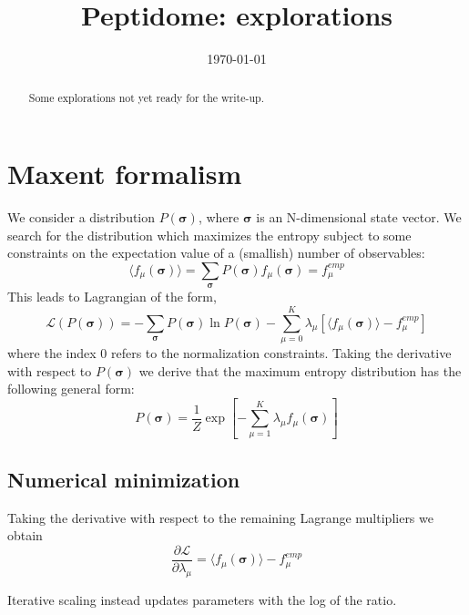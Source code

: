 \documentclass[superscriptaddress,onecolumn,pre]{revtex4}
\newcommand{\B}{\boldsymbol}
\newcommand{\<}{\langle}
\renewcommand{\>}{\rangle}
\def\[[{\left[}
\def\]]{\right]}
\begin{document}
\title{Peptidome: explorations}
\date{\today}

\begin{abstract}
    Some explorations not yet ready for the write-up.
\end{abstract}

\maketitle

\section{Maxent formalism}
We consider a distribution $P(\boldsymbol \sigma)$, where $\boldsymbol \sigma$ is an N-dimensional state vector. We search for the distribution which maximizes the entropy subject to some constraints on the expectation value of a (smallish) number of observables:
\begin{equation}
\langle f_\mu(\boldsymbol \sigma)\rangle = \sum_{\boldsymbol \sigma} P(\boldsymbol \sigma) f_\mu(\boldsymbol \sigma) = f_\mu^{emp}
\end{equation}
This leads to Lagrangian of the form,
\begin{equation}
    \mathcal{L}(P(\B \sigma)) = - \sum_{\B \sigma} P(\B \sigma) \ln P(\B \sigma) - \sum_{\mu = 0}^K \lambda_\mu \[[ \langle f_\mu(\boldsymbol \sigma) \rangle - f_\mu^{emp} \]]
\end{equation}
where the index 0 refers to the normalization constraints. Taking the derivative with respect to $P(\B \sigma)$ we derive that the maximum entropy distribution has the following general form:
\begin{equation}
    P(\boldsymbol \sigma) = \frac{1}{Z} \exp\left[ -\sum_{\mu=1}^K \lambda_\mu f_\mu(\boldsymbol \sigma) \right]
\end{equation}

\subsection{Numerical minimization}
Taking the derivative with respect to the remaining Lagrange multipliers we obtain
\begin{equation}
    \frac{\partial \mathcal{L}}{\partial \lambda_\mu} = \langle f_\mu(\boldsymbol \sigma) \rangle - f_\mu^{emp}
\end{equation}

Iterative scaling instead updates parameters with the log of the ratio.
\end{document}
